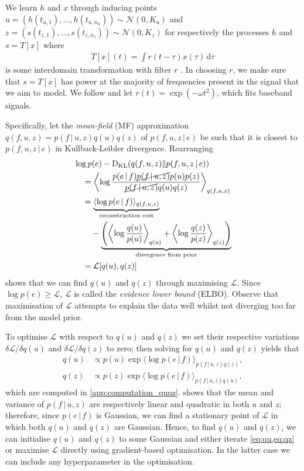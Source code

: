 \documentclass{article}
\newcommand{\KL}{\operatorname{D}_{\text{KL}}}
\newcommand{\id}[1]{\, \mathrm{d} #1}     %
\newcommand{\cond}{\, | \,}               %
\renewcommand{\ll}{\left}
\newcommand{\rr}{\right}
\newcommand{\la}{\langle}
\newcommand{\ra}{\rangle}
\newcommand{\phan}[1]{\hphantom{#1\;}}
\begin{document}
We learn $h$ and $x$ through inducing points \cite{Titsias:2009:Variational_Learning} $u=(h(t_{u,1}),\ldots,h(t_{u,n_u}))\sim \mathcal{N}(0,K_u)$ and $z=(s(t_{z,1}),\ldots,s(t_{z,n_z}))\sim \mathcal{N}(0,K_z)$ for respectively the processes $h$ and $s=T[x]$ where
\begin{align*}
    T[x](t)=\int r(t- \tau)x(\tau) \id{\tau}
\end{align*}
is some interdomain transformation with filter $r$ \cite{Lazaro-Gredilla:2009:Inter-Domain_Gaussian_Processes_for_Sparse,Alvarez:2010:Efficient_Multioutput_Gaussian_Processes_Through,Tobar:2015:Learning_Stationary}. In choosing $r$, we make sure that $s=T[x]$ has power at the majority of frequencies present in the signal that we aim to model. We follow \citet{Tobar:2015:Learning_Stationary} and let $r(t)=\exp(-\omega t^2)$, which fits baseband signals.

Specifically, let the \textit{mean-field} (MF) approximation $q(f,u,z)=p(f\cond u, z)q(u)q(z)$ of $p(f,u,z\cond e)$ be such that it is closest to $p(f,u,z\cond e)$ in Kullback-Leibler divergence. Rearranging
\begin{align*}
    &\log p(e) - \KL(q(f,u,z)\|p(f,u,z\cond e)) \\
    &\quad= \ll\la \log \frac{p(e\cond f)\cancel{p(f\cond u, z)}p(u)p(z)}{\cancel{p(f\cond u, z)}q(u)q(z)} \rr\ra_{q(f,u,z)} \\
    &\quad= \underbrace{\la \log p(e\cond f) \ra_{q(f,u,z)}}_{\text{reconstruction cost}} \\
    &\quad\phan{=}- \underbrace{\ll(\ll\la\log\frac{q(u)}{p(u)}\rr\ra_{q(u)} + \ll\la\log\frac{q(z)}{p(z)}\rr\ra_{q(z)}\rr)}_{\text{divergence from prior}} \\
    &\quad=\mathcal{L}[q(u),q(z)]
\end{align*}
shows that we can find $q(u)$ and $q(z)$ through maximising $\mathcal{L}$. Since $\log p(e)\ge\mathcal{L}$, $\mathcal{L}$ is called the \textit{evidence lower bound} (ELBO). Observe that maximisation of $\mathcal{L}$ attempts to explain the data well whilst not diverging too far from the model prior.

To optimise $\mathcal{L}$ with respect to $q(u)$ and $q(z)$ we set their respective variations $\delta \mathcal{L} / \delta q(u)$ and $\delta \mathcal{L} / \delta q(z)$ to zero; then solving for $q(u)$ and $q(z)$ yields that
\begin{align}
    q(u) &\propto p(u) \exp \la \log p(e\cond f) \ra_{p(f\cond u,z)q(z)}, \label{eq:qu} \\
    q(z) &\propto p(z) \exp \la \log p(e\cond f) \ra_{p(f\cond u,z)q(u)}, \label{eq:qz}
\end{align}
which are computed in \cref{app:computation_quqz}.
 shows that the mean and variance of $p(f\cond u, z)$ are respectively linear and quadratic in both $u$ and $z$; therefore, since $p(e\cond f)$ is Gaussian, we can find a stationary point of $\mathcal{L}$ in which both $q(u)$ and $q(z)$ are Gaussian. Hence, to find $q(u)$ and $q(z)$, we can initialise $q(u)$ and $q(z)$ to some Gaussian and either iterate \cref{eq:qu,eq:qz} or maximise $\mathcal{L}$ directly using gradient-based optimisation. In the latter case we can include any hyperparameter in the optimisation.
\end{document}
